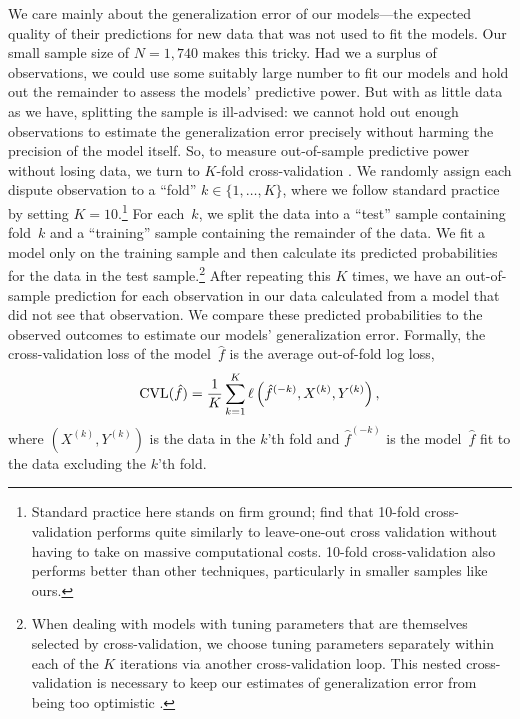 We care mainly about the generalization error of our models---the expected quality of their predictions for new data that was not used to fit the models.
Our small sample size of $N = 1{,}740$ makes this tricky.
Had we a surplus of observations, we could use some suitably large number to fit our models and hold out the remainder to assess the models' predictive power.
But with as little data as we have, splitting the sample is ill-advised: we cannot hold out enough observations to estimate the generalization error precisely without harming the precision of the model itself.
So, to measure out-of-sample predictive power without losing data, we turn to $K$-fold cross-validation \citep[241--249]{Hastie:2009wpa}.
We randomly assign each dispute observation to a ``fold'' $k \in \{1, \ldots, K\}$, where we follow standard practice by setting $K = 10$.\footnote{%
  Standard practice here stands on firm ground; \citet{molinaro2005} find that 10-fold cross-validation performs quite similarly to leave-one-out cross validation without having to take on massive computational costs.
  10-fold cross-validation also performs better than other techniques, particularly in smaller samples like ours.
}
For each~$k$, we split the data into a ``test'' sample containing fold~$k$ and a ``training'' sample containing the remainder of the data.
We fit a model only on the training sample and then calculate its predicted probabilities for the data in the test sample.\footnote{%
  \label{fn:nested-cv}%
  When dealing with models with tuning parameters that are themselves selected by cross-validation, we choose tuning parameters separately within each of the $K$ iterations via another cross-validation loop.
  This nested cross-validation is necessary to keep our estimates of generalization error from being too optimistic \citep{Varma:2006ch}.
}
After repeating this $K$ times, we have an out-of-sample prediction for each observation in our data calculated from a model that did not see that observation.
We compare these predicted probabilities to the observed outcomes to estimate our models' generalization error.
Formally, the cross-validation loss of the model~$\hat{f}$ is the average out-of-fold log loss,
\begin{equation}
  \label{eq:cv-loss}
  \operatorname{CVL}(\hat{f})
  =
  \frac{1}{K} \sum_{k=1}^K \ell \left(
    \hat{f}^{(-k)}, X^{(k)}, Y^{(k)}
  \right),
\end{equation}
where $(X^{(k)}, Y^{(k)})$ is the data in the $k$'th fold and $\hat{f}^{(-k)}$ is the model~$\hat{f}$ fit to the data excluding the $k$'th fold.


